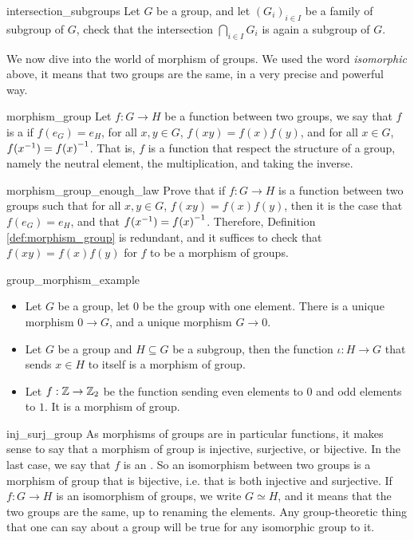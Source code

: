 \begin{cex}{}{intersection_subgroups}
    Let \( G \) be a group, and let \( (G_i)_{i \in I} \) be a family of subgroup of \( G \), check that the intersection \( \bigcap_{i\in I} G_i \) is again a subgroup of \( G \).
\end{cex}

We now dive into the world of morphism of groups. We used the word \textit{isomorphic} above, it means that two groups are the same, in a very precise and powerful way.

\begin{cdef}{}{morphism_group}
    Let \( f : G \to H \) be a function between two groups, we say that \( f \) is a  if \( f(e_G) = e_H \), for all \( x, y \in G \), \( f(xy) = f(x)f(y) \), and for all \( x \in G \), \( f({x}^{-1}) = {f(x)}^{-1} \). That is, \( f \) is a function that respect the structure of a group, namely the neutral element, the multiplication, and taking the inverse. 
\end{cdef}

\begin{cex}{}{morphism_group_enough_law}
    Prove that if \( f : G \to H \) is a function between two groups such that for all \( x, y \in G \), \( f(xy) = f(x)f(y) \), then it is the case that \( f(e_G) = e_H \), and that \( f({x}^{-1}) = {f(x)}^{-1} \). Therefore, Definition \ref{def:morphism_group} is redundant, and it suffices to check that \( f(xy) = f(x)f(y) \) for \( f \) to be a morphism of groups.
\end{cex}

\begin{cexp}{}{group_morphism_example}
    \begin{itemize}
        \item Let \( G \) be a group, let \( 0 \) be the group with one element. There is a unique morphism \( 0 \to G \), and a unique morphism \( G \to 0 \).
        \item Let \( G \) be a group and \( H \subseteq G \) be a subgroup, then the function \( \iota : H \to G \) that sends \( x \in H \) to itself is a morphism of group.
        \item Let \( f : \mathbb{Z} \to \mathbb{Z}_2 \) be the function sending even elements to \( 0 \) and odd elements to \( 1 \). It is a morphism of group. 
    \end{itemize}
\end{cexp}

\begin{crem}{}{inj_surj_group}
    As morphisms of groups are in particular functions, it makes sense to say that a morphism of group is injective, surjective, or bijective. In the last case, we say that \( f \) is an . So an isomorphism between two groups is a morphism of group that is bijective, i.e. that is both injective and surjective. If \( f : G \to H \) is an isomorphism of groups, we write \( G \simeq H \), and it means that the two groups are the same, up to renaming the elements. Any group-theoretic thing that one can say about a group will be true for any isomorphic group to it.
\end{crem}

